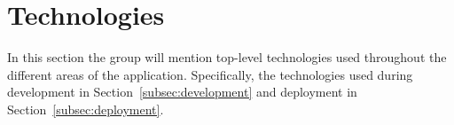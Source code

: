 \section{Technologies}\label{sec:technologies}

In this section the group will mention top-level technologies used throughout the different areas of the application.
Specifically, the technologies used during development in Section~\ref{subsec:development} and deployment in
Section~\ref{subsec:deployment}.



